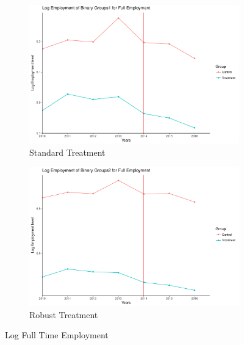 \documentclass[a4paper]{article}
\begin{document}
{\begin{figure}
\begin{subfigure}[h]{0.5\linewidth}
\includegraphics[width=\textwidth]{q6/plot_treatment_t1full.pdf}
\caption{Standard Treatment}
\end{subfigure}
\hfill
\begin{subfigure}[h]{0.5\linewidth}
\includegraphics[width=\linewidth]{q6/plot_treatment_ta2full.pdf}
\caption{Robust Treatment}
\end{subfigure}%
\caption{Log Full Time Employment}
\label{q6f}
\end{figure}

}
\end{document}

